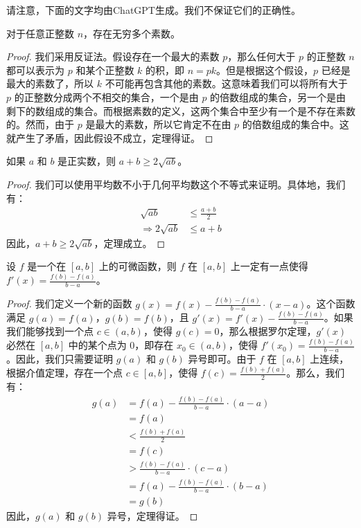 请注意，下面的文字均由ChatGPT生成。我们不保证它们的正确性。

\begin{thm}
    对于任意正整数 $n$，存在无穷多个素数。
\end{thm}

\begin{proof}
    我们采用反证法。假设存在一个最大的素数 $p$，那么任何大于 $p$ 的正整数 $n$ 都可以表示为 $p$ 和某个正整数 $k$ 的积，即 $n = pk$。但是根据这个假设，$p$ 已经是最大的素数了，所以 $k$ 不可能再包含其他的素数。这意味着我们可以将所有大于 $p$ 的正整数分成两个不相交的集合，一个是由 $p$ 的倍数组成的集合，另一个是由剩下的数组成的集合。而根据素数的定义，这两个集合中至少有一个是不存在素数的。然而，由于 $p$ 是最大的素数，所以它肯定不在由 $p$ 的倍数组成的集合中。这就产生了矛盾，因此假设不成立，定理得证。
\end{proof}

\begin{cor}
    如果 $a$ 和 $b$ 是正实数，则 $a+b \geq 2\sqrt{ab}$。
\end{cor}

\begin{proof}
    我们可以使用平均数不小于几何平均数这个不等式来证明。具体地，我们有：
    \begin{align*}
        \sqrt{ab}              & \leq \frac{a+b}{2} \\
        \Rightarrow 2\sqrt{ab} & \leq a+b
    \end{align*}
    因此，$a+b \geq 2\sqrt{ab}$，定理成立。
\end{proof}

\begin{lem}
    设 $f$ 是一个在 $[a,b]$ 上的可微函数，则 $f$ 在 $[a,b]$ 上一定有一点使得 $f'(x) = \frac{f(b)-f(a)}{b-a}$。
\end{lem}

\begin{proof}
    我们定义一个新的函数 $g(x) = f(x) - \frac{f(b)-f(a)}{b-a} \cdot (x-a)$。这个函数满足 $g(a) = f(a)$，$g(b) = f(b)$，且 $g'(x) = f'(x) - \frac{f(b)-f(a)}{b-a}$。如果我们能够找到一个点 $c \in (a,b)$，使得 $g(c) = 0$，那么根据罗尔定理，$g'(x)$ 必然在 $[a,b]$ 中的某个点为 $0$，即存在 $x_0 \in (a,b)$，使得 $f'(x_0) = \frac{f(b)-f(a)}{b-a}$。因此，我们只需要证明 $g(a)$ 和 $g(b)$ 异号即可。由于 $f$ 在 $[a,b]$ 上连续，根据介值定理，存在一个点 $c \in [a,b]$，使得 $f(c) = \frac{f(b)+f(a)}{2}$。那么，我们有：
    \begin{align*}
        g(a) & = f(a) - \frac{f(b)-f(a)}{b-a} \cdot (a-a) \\
             & = f(a)                                     \\
             & < \frac{f(b)+f(a)}{2}                      \\
             & = f(c)                                     \\
             & > \frac{f(b)-f(a)}{b-a} \cdot (c-a)        \\
             & = f(a) - \frac{f(b)-f(a)}{b-a} \cdot (b-a) \\
             & = g(b)
    \end{align*}
    因此，$g(a)$ 和 $g(b)$ 异号，定理得证。
\end{proof}

